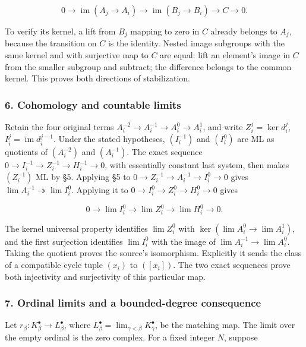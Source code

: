 \documentclass[11pt]{article}
\begin{document}
\[
0\to\operatorname{im}(A_j\to A_i)
\to\operatorname{im}(B_j\to B_i)\to C\to0.
\]

To verify its kernel, a lift from \(B_j\) mapping to zero in \(C\) already belongs to \(A_j\), because the transition on \(C\) is the identity. Nested image subgroups with the same kernel and with surjective map to \(C\) are equal: lift an element's image in \(C\) from the smaller subgroup and subtract; the difference belongs to the common kernel. This proves both directions of stabilization.

\subsubsection{6. Cohomology and countable limits}\label{cohomology-and-countable-limits}

Retain the four original terms \(A_i^{-2}\to A_i^{-1}\to A_i^0\to A_i^1\), and write \(Z_i^j=\ker d_i^j\), \(I_i^j=\operatorname{im}d_i^{j-1}\). Under the stated hypotheses, \((I_i^{-1})\) and \((I_i^0)\) are ML as quotients of \((A_i^{-2})\) and \((A_i^{-1})\). The exact sequence \(0\to I_i^{-1}\to Z_i^{-1}\to H_i^{-1}\to0\), with essentially constant last system, then makes \((Z_i^{-1})\) ML by §5. Applying §5 to \(0\to Z_i^{-1}\to A_i^{-1}\to I_i^0\to0\) gives \(\lim A_i^{-1}\twoheadrightarrow\lim I_i^0\). Applying it to \(0\to I_i^0\to Z_i^0\to H_i^0\to0\) gives

\[
0\to\lim I_i^0\to\lim Z_i^0\to\lim H_i^0\to0.
\]

The kernel universal property identifies \(\lim Z_i^0\) with \(\ker(\lim A_i^0\to\lim A_i^1)\), and the first surjection identifies \(\lim I_i^0\) with the image of \(\lim A_i^{-1}\to\lim A_i^0\). Taking the quotient proves the source's isomorphism. Explicitly it sends the class of a compatible cycle tuple \((x_i)\) to \(([x_i])\). The two exact sequences prove both injectivity and surjectivity of this particular map.

\subsubsection{7. Ordinal limits and a bounded-degree consequence}\label{ordinal-limits-and-a-bounded-degree-consequence}

Let \(r_\beta:K_\beta^\bullet\to L_\beta^\bullet\), where \(L_\beta^\bullet=\lim_{\gamma<\beta}K_\gamma^\bullet\), be the matching map. The limit over the empty ordinal is the zero complex. For a fixed integer \(N\), suppose
\end{document}
